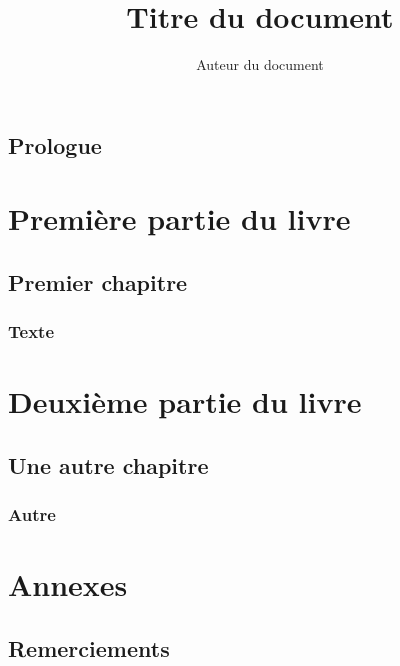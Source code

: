 \documentclass[10pt,a4paper,french]{book}
\begin{document}
\title{Titre du document}
\author{Auteur du document}
\maketitle


\tableofcontents

\frontmatter %
\chapter{Prologue}

\mainmatter %

\part{Première partie du livre}
\chapter{Premier chapitre}
\section{Texte}

\part{Deuxième partie du livre}
\chapter{Une autre chapitre}
\section{Autre}

\appendix %
\part{Annexes}

\chapter{Remerciements}

\backmatter %

\printindex
\end{document}
